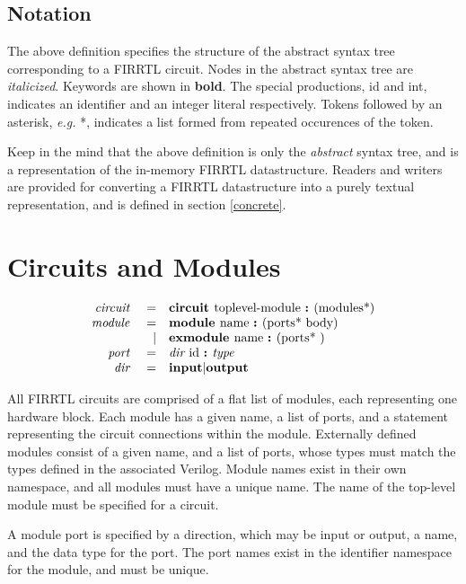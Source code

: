 \documentclass[12pt]{article}
\begin{document}
\subsection{Notation}
The above definition specifies the structure of the abstract syntax tree corresponding to a FIRRTL circuit. Nodes in the abstract syntax tree are {\em italicized}. Keywords are shown in {\bf bold}. The special productions, id and int, indicates an identifier and an integer literal respectively. Tokens followed by an asterisk, {\em e.g.} *, indicates a list formed from repeated occurences of the token.

Keep in the mind that the above definition is only the {\em abstract} syntax tree, and is a representation of the in-memory FIRRTL datastructure. Readers and writers are provided for converting a FIRRTL datastructure into a purely textual representation, and is defined in section \ref{concrete}.


\section{Circuits and Modules}
\[
\begin{array}{rrl}
\text{\em circuit\ }    &=     &\text{\bf circuit\ } \text{toplevel-module } \text{\bf :\ } (\text{modules*}) \\
\text{\em module\ }     &=     &\text{\bf module\ }  \text{name } \text{\bf :\ } (\text{ports* } \text{body}) \\
                &\vert &\text{\bf exmodule\ }  \text{name } \text{\bf :\ } (\text{ports* })           \\ 
\text{\em port\ }       &=     &\text{\em dir\ } \text{id } \text{\bf :\ } \text{\em type\ }                                 \\
\text{\em dir\ }        &=     &\text{\bf input} \vert \text{\bf output}                                \\
\end{array}
\]

All FIRRTL circuits are comprised of a flat list of modules, each representing one hardware block. Each module has a given name, a list of ports, and a statement representing the circuit connections within the module. Externally defined modules consist of a given name, and a list of ports, whose types must match the types defined in the associated Verilog. Module names exist in their own namespace, and all modules must have a unique name. The name of the top-level module must be specified for a circuit.

A module port is specified by a direction, which may be input or output, a name, and the data type for the port. The port names exist in the identifier namespace for the module, and must be unique.
\end{document}
